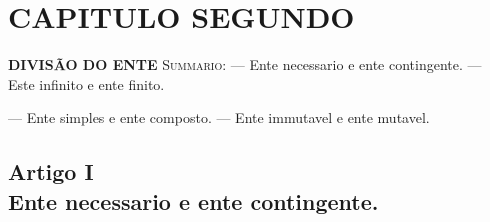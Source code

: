 


\chapter*{CAPITULO SEGUNDO}

\textbf{DIVISÃO DO ENTE} \textsc{Summario}: --- Ente necessario e ente contingente. --- Este infinito e ente finito.

--- Ente simples e ente composto. --- Ente immutavel e ente mutavel.


\section*{Artigo I\\ Ente necessario e ente contingente.}

